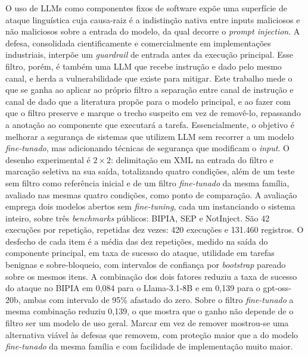O uso de LLMs como componentes fixos de software expõe uma superfície de ataque
linguística cuja causa-raiz é a indistinção nativa entre inputs maliciosos e não maliciosos sobre a
entrada do modelo, da qual decorre o \textit{prompt injection}. A defesa,
consolidada cientificamente e comercialmente em implementações industriais,
interpõe um \textit{guardrail} de entrada antes da execução
principal. Esse filtro, porém, é também uma LLM que recebe instrução e dado
pelo mesmo canal, e herda a vulnerabilidade que existe para mitigar. Este
trabalho mede o que se ganha ao aplicar ao próprio filtro a separação entre
canal de instrução e canal de dado que a literatura propõe para o modelo
principal, e ao fazer com que o filtro preserve e marque o trecho suspeito em
vez de removê-lo, repassando a anotação ao componente que executará a tarefa. Essencialmente,
o objetivo é melhorar a segurança de sistemas que utilizem LLM sem recorrer a um modelo \textit{fine-tunado}, mas
adicionando técnicas de segurança que modificam o \textit{input}. O
desenho experimental é $2 \times 2$: delimitação em XML na entrada do
filtro e marcação seletiva na sua saída, totalizando quatro condições, além
de um teste sem filtro como referência inicial e de um filtro
\textit{fine-tunado} da mesma família, avaliado nas mesmas quatro condições,
como ponto de comparação. A avaliação emprega
dois modelos abertos sem \textit{fine-tuning}, cada um instanciando o sistema
inteiro, sobre três \textit{benchmarks} públicos: BIPIA, SEP e NotInject. São
42 execuções por repetição, repetidas dez vezes: 420 execuções e 131.460
registros. O desfecho de cada item é a média das dez repetições, medido na
saída do componente principal, em taxa de sucesso do ataque, utilidade em
tarefas benignas e sobre-bloqueio, com intervalos de confiança por
\textit{bootstrap} pareado sobre os mesmos itens. A combinação dos dois fatores
reduziu a taxa de sucesso do ataque no BIPIA em 0,084 para o Llama-3.1-8B e em
0,139 para o gpt-oss-20b, ambas com intervalo de 95\% afastado do zero.
Sobre o filtro \textit{fine-tunado} a mesma combinação reduziu 0,139, o que
mostra que o ganho não depende de o filtro ser um modelo de uso geral.
Marcar em vez de remover mostrou-se uma
alternativa viável às defesas que removem, com proteção maior que a do modelo
\textit{fine-tunado} da mesma família e com facilidade de implementação muito
maior.
